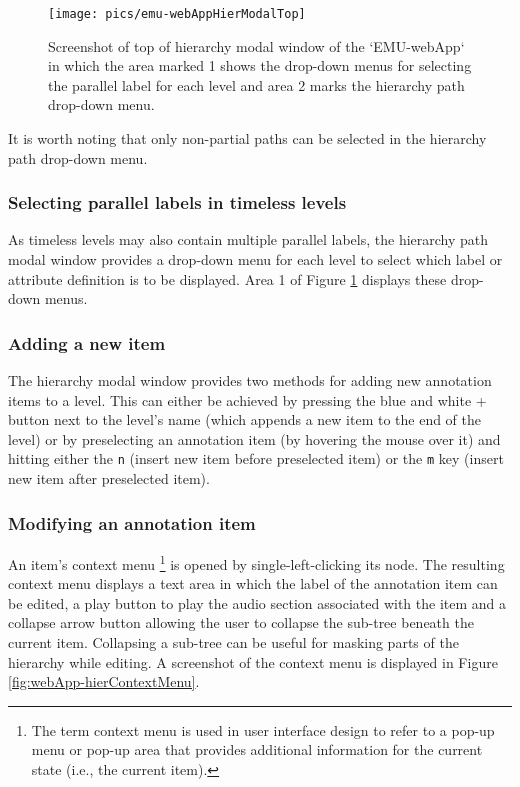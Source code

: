 \documentclass[]{book}
\let\rmarkdownfootnote\footnote%
\def\footnote{\protect\rmarkdownfootnote}
\begin{document}
\begin{figure}

{\centering \texttt{[image: pics/emu-webAppHierModalTop]} 

}

\caption{Screenshot of top of hierarchy modal window of the `EMU-webApp` in which the area marked 1 shows the drop-down menus for selecting the parallel label for each level and area 2 marks the hierarchy path drop-down menu.}\label{fig:webApp-hierModalTop}
\end{figure}

It is worth noting that only non-partial paths can be selected in the hierarchy path drop-down menu.

\hypertarget{selecting-parallel-labels-in-timeless-levels}{%
\subsubsection{Selecting parallel labels in timeless levels}\label{selecting-parallel-labels-in-timeless-levels}}

As timeless levels may also contain multiple parallel labels, the hierarchy path modal window provides a drop-down menu for each level to select which label or attribute definition is to be displayed. Area 1 of Figure \ref{fig:webApp-hierModalTop} displays these drop-down menus.

\hypertarget{adding-a-new-item}{%
\subsubsection{Adding a new item}\label{adding-a-new-item}}

The hierarchy modal window provides two methods for adding new annotation items to a level. This can either be achieved by pressing the blue and white + button next to the level's name (which appends a new item to the end of the level) or by preselecting an annotation item (by hovering the mouse over it) and hitting either the \texttt{n} (insert new item before preselected item) or the \texttt{m} key (insert new item after preselected item).

\hypertarget{modifying-an-annotation-item}{%
\subsubsection{Modifying an annotation item}\label{modifying-an-annotation-item}}

An item's context menu \footnote{The term context menu is used in user interface design to refer to a pop-up menu or pop-up area that provides additional information for the current state (i.e., the current item).} is opened by single-left-clicking its node. The resulting context menu displays a text area in which the label of the annotation item can be edited, a play button to play the audio section associated with the item and a collapse arrow button allowing the user to collapse the sub-tree beneath the current item. Collapsing a sub-tree can be useful for masking parts of the hierarchy while editing. A screenshot of the context menu is displayed in Figure \ref{fig:webApp-hierContextMenu}.
\end{document}

